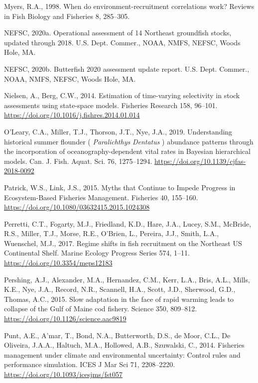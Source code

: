 \documentclass[]{article}
\begin{document}
\leavevmode\hypertarget{ref-myers1998When}{}%
Myers, R.A., 1998. When do environment-recruitment correlations work?
Reviews in Fish Biology and Fisheries 8, 285--305.

\leavevmode\hypertarget{ref-nefsc2020Operational}{}%
NEFSC, 2020a. Operational assessment of 14 Northeast groundfish stocks,
updated through 2018. U.S. Dept. Commer., NOAA, NMFS, NEFSC, Woods Hole,
MA.

\leavevmode\hypertarget{ref-nefsc2020Butterfish}{}%
NEFSC, 2020b. Butterfish 2020 assessment update report. U.S. Dept.
Commer., NOAA, NMFS, NEFSC, Woods Hole, MA.

\leavevmode\hypertarget{ref-nielsen2014Estimation}{}%
Nielsen, A., Berg, C.W., 2014. Estimation of time-varying selectivity in
stock assessments using state-space models. Fisheries Research 158,
96--101. \url{https://doi.org/10.1016/j.fishres.2014.01.014}

\leavevmode\hypertarget{ref-oleary2019Understanding}{}%
O'Leary, C.A., Miller, T.J., Thorson, J.T., Nye, J.A., 2019.
Understanding historical summer flounder ( \emph{Paralichthys}
\emph{Dentatus} ) abundance patterns through the incorporation of
oceanography-dependent vital rates in Bayesian hierarchical models. Can.
J. Fish. Aquat. Sci. 76, 1275--1294.
\url{https://doi.org/10.1139/cjfas-2018-0092}

\leavevmode\hypertarget{ref-patrick2015Myths}{}%
Patrick, W.S., Link, J.S., 2015. Myths that Continue to Impede Progress
in Ecosystem-Based Fisheries Management. Fisheries 40, 155--160.
\url{https://doi.org/10.1080/03632415.2015.1024308}

\leavevmode\hypertarget{ref-perretti2017Regime}{}%
Perretti, C.T., Fogarty, M.J., Friedland, K.D., Hare, J.A., Lucey, S.M.,
McBride, R.S., Miller, T.J., Morse, R.E., O'Brien, L., Pereira, J.J.,
Smith, L.A., Wuenschel, M.J., 2017. Regime shifts in fish recruitment on
the Northeast US Continental Shelf. Marine Ecology Progress Series 574,
1--11. \url{https://doi.org/10.3354/meps12183}

\leavevmode\hypertarget{ref-pershing2015Slow}{}%
Pershing, A.J., Alexander, M.A., Hernandez, C.M., Kerr, L.A., Bris,
A.L., Mills, K.E., Nye, J.A., Record, N.R., Scannell, H.A., Scott, J.D.,
Sherwood, G.D., Thomas, A.C., 2015. Slow adaptation in the face of rapid
warming leads to collapse of the Gulf of Maine cod fishery. Science 350,
809--812. \url{https://doi.org/10.1126/science.aac9819}

\leavevmode\hypertarget{ref-punt2014Fisheries}{}%
Punt, A.E., A'mar, T., Bond, N.A., Butterworth, D.S., de Moor, C.L., De
Oliveira, J.A.A., Haltuch, M.A., Hollowed, A.B., Szuwalski, C., 2014.
Fisheries management under climate and environmental uncertainty:
Control rules and performance simulation. ICES J Mar Sci 71, 2208--2220.
\url{https://doi.org/10.1093/icesjms/fst057}
\end{document}
